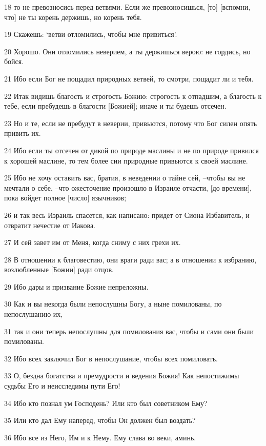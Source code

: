 \par 18 то не превозносись перед ветвями. Если же превозносишься, [то] [вспомни, что] не ты корень держишь, но корень тебя.
\par 19 Скажешь: `ветви отломились, чтобы мне привиться'.
\par 20 Хорошо. Они отломились неверием, а ты держишься верою: не гордись, но бойся.
\par 21 Ибо если Бог не пощадил природных ветвей, то смотри, пощадит ли и тебя.
\par 22 Итак видишь благость и строгость Божию: строгость к отпадшим, а благость к тебе, если пребудешь в благости [Божией]; иначе и ты будешь отсечен.
\par 23 Но и те, если не пребудут в неверии, привьются, потому что Бог силен опять привить их.
\par 24 Ибо если ты отсечен от дикой по природе маслины и не по природе привился к хорошей маслине, то тем более сии природные привьются к своей маслине.
\par 25 Ибо не хочу оставить вас, братия, в неведении о тайне сей, --чтобы вы не мечтали о себе, --что ожесточение произошло в Израиле отчасти, [до времени], пока войдет полное [число] язычников;
\par 26 и так весь Израиль спасется, как написано: придет от Сиона Избавитель, и отвратит нечестие от Иакова.
\par 27 И сей завет им от Меня, когда сниму с них грехи их.
\par 28 В отношении к благовестию, они враги ради вас; а в отношении к избранию, возлюбленные [Божии] ради отцов.
\par 29 Ибо дары и призвание Божие непреложны.
\par 30 Как и вы некогда были непослушны Богу, а ныне помилованы, по непослушанию их,
\par 31 так и они теперь непослушны для помилования вас, чтобы и сами они были помилованы.
\par 32 Ибо всех заключил Бог в непослушание, чтобы всех помиловать.
\par 33 О, бездна богатства и премудрости и ведения Божия! Как непостижимы судьбы Его и неисследимы пути Его!
\par 34 Ибо кто познал ум Господень? Или кто был советником Ему?
\par 35 Или кто дал Ему наперед, чтобы Он должен был воздать?
\par 36 Ибо все из Него, Им и к Нему. Ему слава во веки, аминь.

